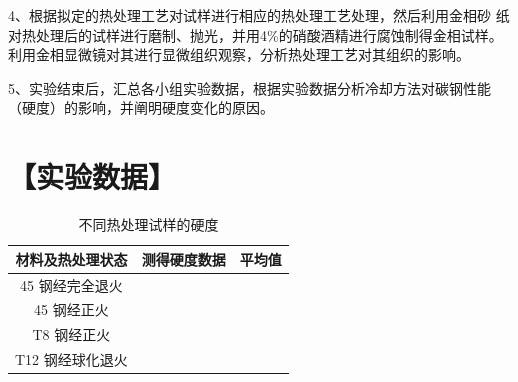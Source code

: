 \documentclass[a4paper,utf8]{article}
\begin{document}
4、根据拟定的热处理工艺对试样进行相应的热处理工艺处理，然后利用金相砂
纸对热处理后的试样进行磨制、抛光，并用4\%的硝酸酒精进行腐蚀制得金相试样。
利用金相显微镜对其进行显微组织观察，分析热处理工艺对其组织的影响。

5、实验结束后，汇总各小组实验数据，根据实验数据分析冷却方法对碳钢性能（硬度）的影响，并阐明硬度变化的原因。

\newpage

\section*{【实验数据】}

\begin{table}[!ht]\centering
    \caption{不同热处理试样的硬度}
    \extrarowheight=11pt
    \begin{tabularx}{\textwidth}{|c|X|X|X|X|}\hline
        材料及热处理状态 & \multicolumn{3}{c}{测得硬度数据} & \hfil 平均值 \hfil \\[10pt] \hline
        45 钢经完全退火 &  &  &  &  \\[10pt] \hline
        45 钢经正火 &  &  &  &  \\[10pt] \hline
        T8 钢经正火 &  &  &  &  \\[10pt] \hline
        T12 钢经球化退火 &  &  &  &  \\[10pt] \hline
    \end{tabularx}
\end{table}
\end{document}
